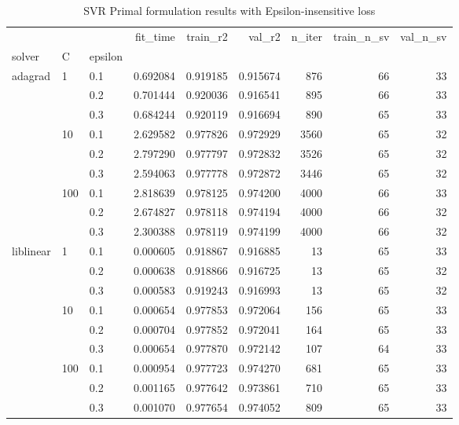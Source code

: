 \begin{table}[h!]
\centering
\caption{SVR Primal formulation results with Epsilon-insensitive loss}
\label{primal_svr_eps_cv_results}
\begin{tabular}{lllrrrrrr}
\toprule
          &     &     &  fit\_time &  train\_r2 &    val\_r2 &  n\_iter &  train\_n\_sv &  val\_n\_sv \\
solver & C & epsilon &           &           &           &         &             &           \\
\midrule
adagrad & 1   & 0.1 &  0.692084 &  0.919185 &  0.915674 &     876 &          66 &        33 \\
          &     & 0.2 &  0.701444 &  0.920036 &  0.916541 &     895 &          66 &        33 \\
          &     & 0.3 &  0.684244 &  0.920119 &  0.916694 &     890 &          65 &        33 \\
          & 10  & 0.1 &  2.629582 &  0.977826 &  0.972929 &    3560 &          65 &        32 \\
          &     & 0.2 &  2.797290 &  0.977797 &  0.972832 &    3526 &          65 &        32 \\
          &     & 0.3 &  2.594063 &  0.977778 &  0.972872 &    3446 &          65 &        32 \\
          & 100 & 0.1 &  2.818639 &  0.978125 &  0.974200 &    4000 &          66 &        33 \\
          &     & 0.2 &  2.674827 &  0.978118 &  0.974194 &    4000 &          66 &        32 \\
          &     & 0.3 &  2.300388 &  0.978119 &  0.974199 &    4000 &          66 &        32 \\
liblinear & 1   & 0.1 &  0.000605 &  0.918867 &  0.916885 &      13 &          65 &        33 \\
          &     & 0.2 &  0.000638 &  0.918866 &  0.916725 &      13 &          65 &        32 \\
          &     & 0.3 &  0.000583 &  0.919243 &  0.916993 &      13 &          65 &        32 \\
          & 10  & 0.1 &  0.000654 &  0.977853 &  0.972064 &     156 &          65 &        33 \\
          &     & 0.2 &  0.000704 &  0.977852 &  0.972041 &     164 &          65 &        33 \\
          &     & 0.3 &  0.000654 &  0.977870 &  0.972142 &     107 &          64 &        33 \\
          & 100 & 0.1 &  0.000954 &  0.977723 &  0.974270 &     681 &          65 &        33 \\
          &     & 0.2 &  0.001165 &  0.977642 &  0.973861 &     710 &          65 &        33 \\
          &     & 0.3 &  0.001070 &  0.977654 &  0.974052 &     809 &          65 &        33 \\
\bottomrule
\end{tabular}
\end{table}
